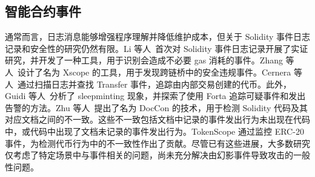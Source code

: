 \subsection{智能合约事件}
通常而言，日志消息能够增强程序理解并降低维护成本，但关于 Solidity 事件日志记录和安全性的研究仍然有限。Li 等人~\cite{li2023understanding}首次对 Solidity 事件日志记录开展了实证研究，并开发了一种工具，用于识别会造成不必要 gas 消耗的事件。Zhang 等人~\cite{Xscope}设计了名为 Xscope 的工具，用于发现跨链桥中的安全违规事件。Cernera 等人~\cite{cernera2023token}通过扫描日志并查找 Transfer 事件，追踪由内部交易创建的代币。此外，Guidi 等人~\cite{sleepminting}分析了 sleepminting 现象，并探索了使用 Forta 追踪可疑事件和发出告警的方法。Zhu 等人~\cite{doccon}提出了名为 DocCon 的技术，用于检测 Solidity 代码及其对应文档之间的不一致。这些不一致包括文档中记录的事件发出行为未出现在代码中，或代码中出现了文档未记录的事件发出行为。TokenScope \cite{TokenScope} 通过监控 ERC-20 事件，为检测代币行为中的不一致性作出了贡献。尽管已有这些进展，大多数研究仅考虑了特定场景中与事件相关的问题，尚未充分解决由幻影事件导致攻击的一般性问题。

\label{sec:related}
